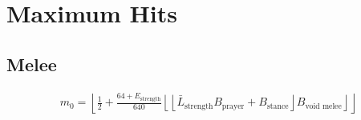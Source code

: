 \chapter{Maximum Hits}




\section{Melee}
	\begin{align}
		m_0 = \left\lfloor \frac{1}{2} + \frac{64 + E_\text{strength}}{640}\left\lfloor\left\lfloor\bar{L}_\text{strength} B_\text{prayer} + B_\text{stance}\right\rfloor B_\text{void melee}\right\rfloor\right\rfloor
	\end{align}




